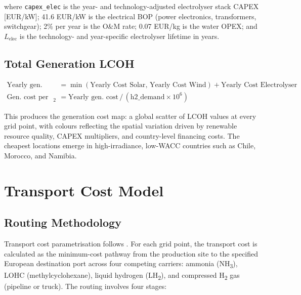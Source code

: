 where \texttt{capex\_elec} is the year- and technology-adjusted electrolyser stack CAPEX [EUR/kW]; 41.6 EUR/kW is the electrical BOP (power electronics, transformers, switchgear); 2\% per year is the O\&M rate; 0.07 EUR/kg is the water OPEX; and $L_{\text{elec}}$ is the technology- and year-specific electrolyser lifetime in years.

\subsection{Total Generation LCOH}

\begin{align}
    \text{Yearly gen.\ cost} &= \min(\text{Yearly Cost Solar},\, \text{Yearly Cost Wind}) + \text{Yearly Cost Electrolyser} \\
    \text{Gen.\ cost per kg H}_2 &= \text{Yearly gen.\ cost} \,/\, (\text{h2\_demand} \times 10^6)
\end{align}

This produces the generation cost map: a global scatter of LCOH values at every grid point, with colours reflecting the spatial variation driven by renewable resource quality, CAPEX multipliers, and country-level financing costs. The cheapest locations emerge in high-irradiance, low-WACC countries such as Chile, Morocco, and Namibia.

\section{Transport Cost Model}
\label{sec:transport}

\subsection{Routing Methodology}

Transport cost parametrisation follows \cite{Collis2022}. For each grid point, the transport cost is calculated as the minimum-cost pathway from the production site to the specified European destination port across four competing carriers: ammonia (NH\textsubscript{3}), LOHC (methylcyclohexane), liquid hydrogen (LH\textsubscript{2}), and compressed H\textsubscript{2} gas (pipeline or truck). The routing involves four stages:

